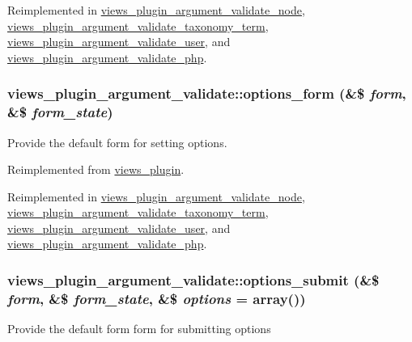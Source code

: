 Reimplemented in \hyperlink{classviews__plugin__argument__validate__node_ada2195af633d2a7ada68d41104c309aa}{views\_\-plugin\_\-argument\_\-validate\_\-node}, \hyperlink{classviews__plugin__argument__validate__taxonomy__term_a480325496a1e66f3cdeb5fb354ca8746}{views\_\-plugin\_\-argument\_\-validate\_\-taxonomy\_\-term}, \hyperlink{classviews__plugin__argument__validate__user_a58ce7613662512981f4a6996c300fa07}{views\_\-plugin\_\-argument\_\-validate\_\-user}, and \hyperlink{classviews__plugin__argument__validate__php_ac6bdb38c1985c81cc4cf6d5aac948378}{views\_\-plugin\_\-argument\_\-validate\_\-php}.\hypertarget{classviews__plugin__argument__validate_a619aac79800de4535d25fd93ce1f08cc}{
\subsubsection[{options\_\-form}]{\setlength{\rightskip}{0pt plus 5cm}views\_\-plugin\_\-argument\_\-validate::options\_\-form (\&\$ {\em form}, \/  \&\$ {\em form\_\-state})}}
\label{classviews__plugin__argument__validate_a619aac79800de4535d25fd93ce1f08cc}
Provide the default form for setting options. 

Reimplemented from \hyperlink{classviews__plugin_a1aaed8da1afd9f45293a37358c159837}{views\_\-plugin}.

Reimplemented in \hyperlink{classviews__plugin__argument__validate__node_a32bc6be973ce19c867ded106753d94e7}{views\_\-plugin\_\-argument\_\-validate\_\-node}, \hyperlink{classviews__plugin__argument__validate__taxonomy__term_a01d0dacfd3e605a0466f9eef497b4e8f}{views\_\-plugin\_\-argument\_\-validate\_\-taxonomy\_\-term}, \hyperlink{classviews__plugin__argument__validate__user_a63c0da1ae23df4d74b0e38e4e27f2bd7}{views\_\-plugin\_\-argument\_\-validate\_\-user}, and \hyperlink{classviews__plugin__argument__validate__php_a150a440c5cdcbad02d6cbd5916f9f0b7}{views\_\-plugin\_\-argument\_\-validate\_\-php}.\hypertarget{classviews__plugin__argument__validate_aff1c9fc15ddc984fb1157f97274e3e6e}{
\subsubsection[{options\_\-submit}]{\setlength{\rightskip}{0pt plus 5cm}views\_\-plugin\_\-argument\_\-validate::options\_\-submit (\&\$ {\em form}, \/  \&\$ {\em form\_\-state}, \/  \&\$ {\em options} = {\ttfamily array()})}}
\label{classviews__plugin__argument__validate_aff1c9fc15ddc984fb1157f97274e3e6e}
Provide the default form form for submitting options 

